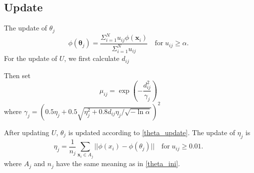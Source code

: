 \documentclass[journal,onecolumn]{IEEEtran}
\theoremstyle{definition}
\begin{document}
\subsection{Update}
\label{sec-1-2}
The update of $\theta_j$
\begin{equation}
\phi(\boldsymbol{\theta}_j)=\frac{\Sigma_{i=1}^Nu_{ij}\phi(\mathbf{x}_i)}{\Sigma_{i=1}^Nu_{ij}} \quad \text{for}\;u_{ij}\geq \alpha.
\label{theta_update}
\end{equation}
For the update of $U$, we first calculate $d_{ij}$
Then set 
\begin{equation}
\label{npcm_u_update}
\mu_{ij}=\exp\left(-\frac{d_{ij}^2}{\gamma_j}\right)
\end{equation}
where $\gamma_j=\left(0.5\eta_{j}+0.5\right)^2$

After updating $U$, $\theta_j$ is updated according to \eqref{theta_update}. The update of $\eta_j$ is 
\begin{equation}
\label{npcm_eta_update}
\eta_j=\frac{1}{n_j}\sum_{\mathbf{x}_i\in A_j}||\phi(x_i)-\phi(\theta_j)|| \quad \text{for}\;u_{ij} \geq 0.01.
\end{equation}
where $A_j$ and $n_j$ have the same meaning as in \eqref{theta_ini}.
\end{document}
